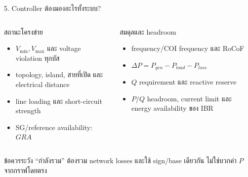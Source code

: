 \documentclass[aspectratio=169,12pt]{beamer}
\begin{document}
\begin{frame}[shrink=8]{5. Controller ต้องมองอะไรทั้งระบบ?}
\begin{columns}[T,onlytextwidth]
\begin{block}{สถานะโครงข่าย}
\begin{itemize}
  \item $V_{\min},V_{\max}$ และ voltage violation ทุกบัส
  \item topology, island, สายที่เปิด และ electrical distance
  \item line loading และ short-circuit strength
  \item SG/reference availability: $GRA$
\end{itemize}
\end{block}
\begin{block}{สมดุลและ headroom}
\begin{itemize}
  \item frequency/COI frequency และ RoCoF
  \item $\Delta P=P_{gen}-P_{load}-P_{loss}$
  \item $Q$ requirement และ reactive reserve
  \item $P/Q$ headroom, current limit และ energy availability ของ IBR
\end{itemize}
\end{block}
\end{columns}
\vspace{.2cm}
\begin{alertblock}{ข้อควรระวัง}
``กำลังรวม'' ต้องรวม network losses และใช้ sign/base เดียวกัน ไม่ใช่บวกค่า $P$ จากกราฟโดยตรง
\end{alertblock}
\end{frame}
\end{document}
